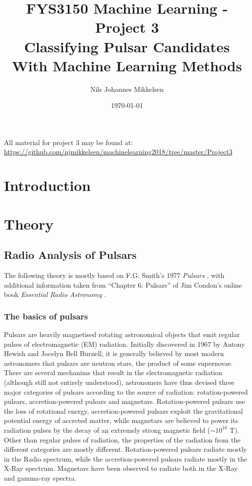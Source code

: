 \documentclass[nofootinbib,reprint,english]{revtex4-1}
\begin{document}
\title{FYS3150 Machine Learning - Project 3\\Classifying Pulsar Candidates With Machine Learning Methods}
\author{Nils Johannes Mikkelsen}
\date{\today}
\noaffiliation
\begin{abstract}

\end{abstract}
\maketitle
All material for project 3 may be found at:\\
{\scriptsize\url{https://github.com/njmikkelsen/machinelearning2018/tree/master/Project3}}
\section{Introduction}

\section{Theory}
\subsection{Radio Analysis of Pulsars}
The following theory is mostly based on F.G. Smith's 1977 \emph{Pulsars} \cite{Pulsars}, with additional information taken from ``Chapter 6: Pulsars'' of Jim Condon's online book \emph{Essential Radio Astronomy} \cite{EssentialRadioAstronomy}.
\subsubsection{The basics of pulsars}
Pulsars are heavily magnetised rotating astronomical objects that emit regular pulses of electromagnetic (EM) radiation. Initially discovered in 1967 by Antony Hewish and Jocelyn Bell Burnell, it is generally believed by most modern astronomers that pulsars are neutron stars, the product of some supernovae. There are several mechanims that result in the electromagnetic radiation (although still not entirely understood), astronomers have thus devised three major categories of pulsars according to the source of radiation: rotation-powered pulsars, accretion-powered pulsars and magnetars. Rotation-powered pulsars use the loss of rotational energy, accretion-powered pulsars exploit the gravitational potential energy of accreted matter, while magnetars are believed to power its radiation pulses by the decay of an extremely strong magnetic field (\(\sim10^{10}\) T). Other than regular pulses of radiation, the properties of the radiation from the different categories are mostly different. Rotation-powered pulsars radiate mostly in the Radio spectrum, while the accretion-powered pulsars radiate mostly in the X-Ray spectrum. Magnetars have been observed to radiate both in the X-Ray and gamma-ray spectra.
\end{document}
